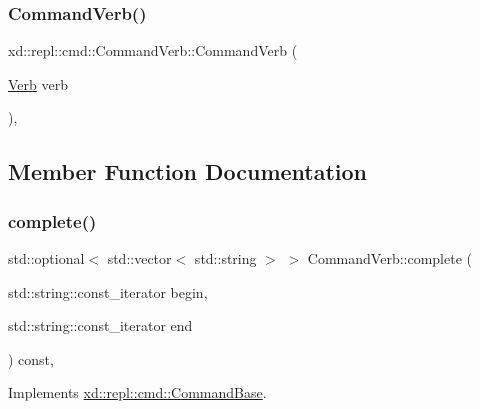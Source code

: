 \subsubsection{\texorpdfstring{Command\+Verb()}{CommandVerb()}}
{\footnotesize\ttfamily xd\+::repl\+::cmd\+::\+Command\+Verb\+::\+Command\+Verb (\begin{DoxyParamCaption}\item[{\mbox{\hyperlink{classxd_1_1repl_1_1cmd_1_1_verb}{Verb}}}]{verb }\end{DoxyParamCaption})\hspace{0.3cm}{\ttfamily [inline]}, {\ttfamily [explicit]}}



\subsection{Member Function Documentation}
\mbox{\label{classxd_1_1repl_1_1cmd_1_1_command_verb_a4e9a0a2ba602a7d7e3802822a6063dff}} 
\subsubsection{\texorpdfstring{complete()}{complete()}}
{\footnotesize\ttfamily std\+::optional$<$ std\+::vector$<$ std\+::string $>$ $>$ Command\+Verb\+::complete (\begin{DoxyParamCaption}\item[{std\+::string\+::const\+\_\+iterator}]{begin,  }\item[{std\+::string\+::const\+\_\+iterator}]{end }\end{DoxyParamCaption}) const\hspace{0.3cm}{\ttfamily [override]}, {\ttfamily [virtual]}}



Implements \mbox{\hyperlink{classxd_1_1repl_1_1cmd_1_1_command_base_a38bae861ceff52dfd3efa19aefbc3971}{xd\+::repl\+::cmd\+::\+Command\+Base}}.

\mbox{\label{classxd_1_1repl_1_1cmd_1_1_command_verb_ab0c91becdb62c517f88800e992b3548f}} 
